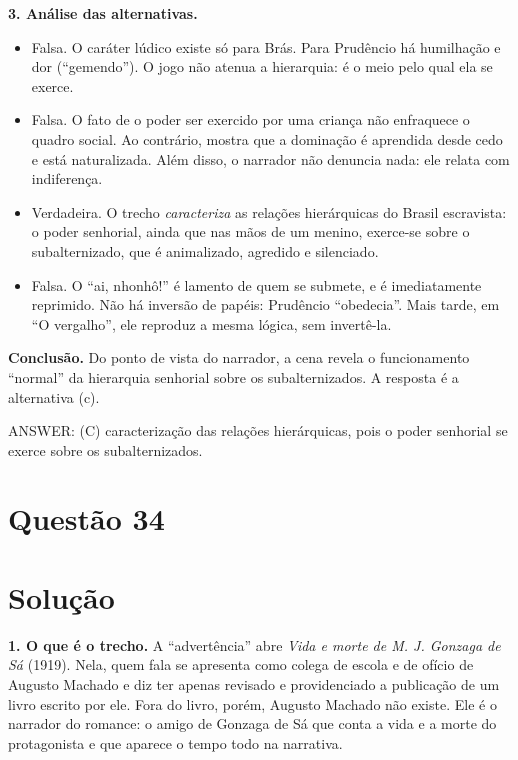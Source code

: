 \documentclass{article}%
\begin{document}
\textbf{3. Análise das alternativas.}
\begin{itemize}
\item[(a)] Falsa. O caráter lúdico existe só para Brás. Para Prudêncio há humilhação e dor (``gemendo''). O jogo não atenua a hierarquia: é o meio pelo qual ela se exerce.
\item[(b)] Falsa. O fato de o poder ser exercido por uma criança não enfraquece o quadro social. Ao contrário, mostra que a dominação é aprendida desde cedo e está naturalizada. Além disso, o narrador não denuncia nada: ele relata com indiferença.
\item[(c)] Verdadeira. O trecho \emph{caracteriza} as relações hierárquicas do Brasil escravista: o poder senhorial, ainda que nas mãos de um menino, exerce-se sobre o subalternizado, que é animalizado, agredido e silenciado.
\item[(d)] Falsa. O ``ai, nhonhô!'' é lamento de quem se submete, e é imediatamente reprimido. Não há inversão de papéis: Prudêncio ``obedecia''. Mais tarde, em ``O vergalho'', ele reproduz a mesma lógica, sem invertê-la.
\end{itemize}

\textbf{Conclusão.} Do ponto de vista do narrador, a cena revela o funcionamento ``normal'' da hierarquia senhorial sobre os subalternizados. A resposta é a alternativa (c).

ANSWER: (C) caracterização das relações hierárquicas, pois o poder senhorial se exerce sobre os subalternizados.%
\newpage%
\section*{Questão 34}

\section*{Solução}

\textbf{1. O que é o trecho.} A ``advertência'' abre \emph{Vida e morte de M. J. Gonzaga de Sá} (1919). Nela, quem fala se apresenta como colega de escola e de ofício de Augusto Machado e diz ter apenas revisado e providenciado a publicação de um livro escrito por ele. Fora do livro, porém, Augusto Machado não existe. Ele é o narrador do romance: o amigo de Gonzaga de Sá que conta a vida e a morte do protagonista e que aparece o tempo todo na narrativa.
\end{document}
